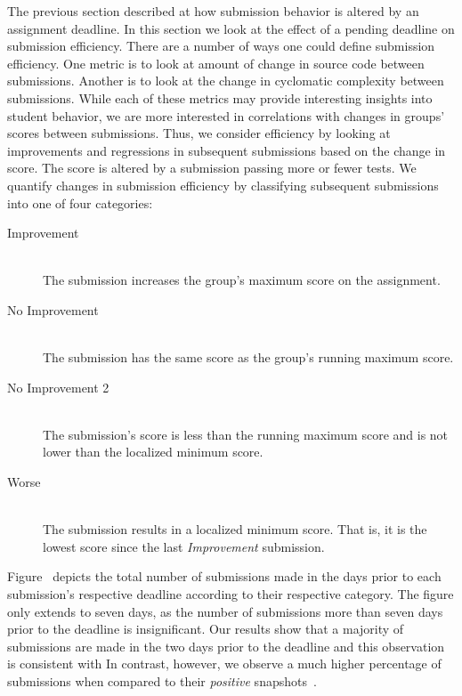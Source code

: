 The previous section described at how submission behavior is altered by an
assignment deadline. In this section we look at the effect of a pending
deadline on submission efficiency. There are a number of ways one could define
submission efficiency. One metric is to look at amount of change in source code
between submissions. Another is to look at the change in cyclomatic complexity
between submissions. While each of these metrics may provide interesting
insights into student behavior, we are more interested in correlations with
changes in groups' scores between submissions. Thus, we consider efficiency by
looking at improvements and regressions in subsequent submissions based on the
change in score. The score is altered by a submission passing more or fewer
tests. We quantify changes in submission efficiency by classifying subsequent
submissions into one of four categories:

\begin{description}
  \item[Improvement] \hfill \\ The submission increases the group's maximum
    score on the assignment.
  \item[No Improvement] \hfill \\ The submission has the same score as the
    group's running maximum score.
  \item[No Improvement 2] \hfill \\ The submission's score is less than the
    running maximum score and is not lower than the localized minimum score.
  \item[Worse] \hfill \\ The submission results in a localized minimum
    score. That is, it is the lowest score since the last \emph{Improvement}
    submission.
\end{description}

Figure~ depicts the total number of submissions
made in the days prior to each submission's respective deadline according to
their respective category. The figure only extends to seven days, as the number
of submissions more than seven days prior to the deadline is insignificant. Our
results show that a majority of submissions are made in the two days prior to
the deadline and this observation is consistent with \spacco[.]{} In contrast,
however, we observe a much higher percentage of \imp{} submissions when
compared to their \emph{positive}
snapshots~\cite{Spacco:2013:TIP:2462476.2465594}.

